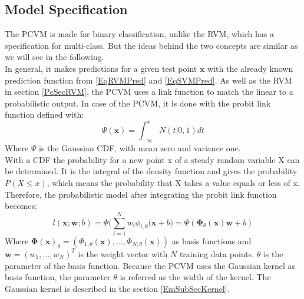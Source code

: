 \subsection{Model Specification}\label{PcSecCM}
The \acs{PCVM} is made for binary classification\cite{Chen.2009}, unlike the \acs{RVM}, which has a specification for multi-class.\cite[p. 220]{Tipping.2001} But the ideas behind the two concepts are similar as we will see in the following.\\
In general, it makes predictions for a given test point $\mathbf{x}$ with the already known prediction function from \eqref{EqRVMPred} and \eqref{EqSVMPred}.\cite{Chen.2009}
As well as the \acs{RVM} in section \ref{PcSecRVM}, the \acs{PCVM} uses a link function to match the linear to a probabilistic output.
In case of the \acs{PCVM}, it is done with the probit link function defined with:\cite{Chen.2014}
\begin{equation}\label{EqPcvmProbit}
\Psi(\mathbf{x}) = \int_{-\infty}^{x}N(t\vert 0,1)dt
\end{equation}
Where $\Psi$ is the Gaussian \ac{CDF}, with mean zero and variance one.\\
With a \ac{CDF} the probability for a new point x of a steady random variable X can be determined.
It is the integral of the density function and gives the probability $P(X \le x)$, which means the probability that X takes a value equals or less of x.\cite[p. 270]{Teschl.2014}\\
Therefore, the probabilistic model after integrating the probit link function becomes:
\begin{equation}
l(\mathbf{x};\mathbf{w};b) = \Psi\bigg(\sum_{i=1}^{N}w_i\phi_{i,\theta}(\mathbf{x}+b \bigg) = \Psi(\boldsymbol{\Phi}_\theta(\mathbf{x})\mathbf{w}+b)
\end{equation}
Where $\boldsymbol{\Phi(\mathbf{x})}_\theta=(\Phi_{1,\theta}(\mathbf{x}),\dots,\Phi_{N,\theta}(\mathbf{x}))$ as basis functions and $\mathbf{w} = (w_1,\dots,w_N)^T$ is the weight vector with $N$ training data points.
$\theta$ is the parameter of the basis function. Because the \ac{PCVM} uses the Gaussian kernel as basis function, the parameter $\theta$ is referred as the width of the kernel.\cite{Chen.2009}
The Gaussian kernel is described in the section \ref{EmSubSecKernel}.
